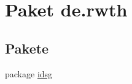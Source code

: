 \hypertarget{namespacede_1_1rwth}{\section{Paket de.\+rwth}
\label{namespacede_1_1rwth}
}
\subsection*{Pakete}
\begin{DoxyCompactItemize}
\item 
package \hyperlink{namespacede_1_1rwth_1_1idsg}{idsg}
\end{DoxyCompactItemize}
